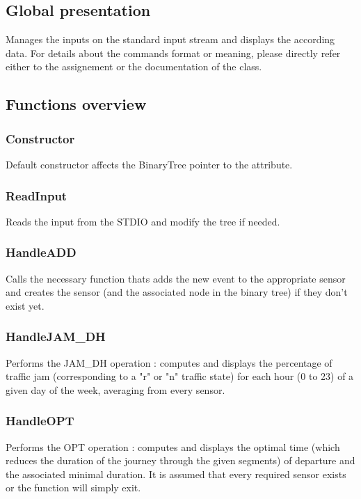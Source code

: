 \documentclass[10pt]{article}
\begin{document}
\subsection{Global presentation}
Manages the inputs on the standard input stream and displays the according data. For details about the commands format or meaning, please directly refer either to the assignement or the documentation of the class.

\subsection{Functions overview}

\subsubsection*{Constructor}
Default constructor affects the BinaryTree pointer to the attribute.

\subsubsection*{ReadInput}
Reads the input from the STDIO and modify the tree if needed.

\subsubsection*{HandleADD}
Calls the necessary function thats adds the new event to the appropriate sensor and creates the sensor (and the associated node in the binary tree) if they don't exist yet.

\subsubsection*{HandleJAM\_DH}
Performs the JAM\_DH operation : computes and displays the percentage of traffic jam (corresponding to a "r" or "n" traffic state) for each hour (0 to 23) of a given day of the week, averaging from every sensor.

\subsubsection*{HandleOPT}
Performs the OPT operation : computes and displays the optimal time (which reduces the duration of the journey through the given segments) of departure and the associated minimal duration. It is assumed that every required sensor exists or the function will simply exit.
\end{document}
